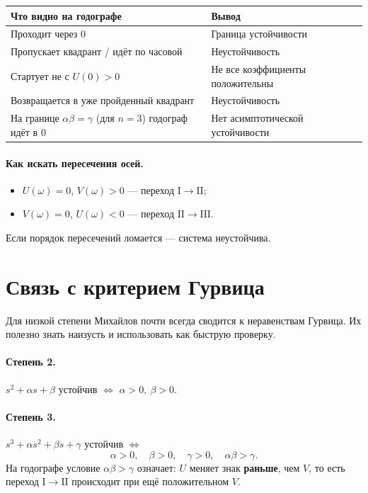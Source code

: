 \documentclass[11pt,a4paper]{article}
\begin{document}
\noindent
\renewcommand{\arraystretch}{1.25}%
\begin{tabularx}{\textwidth}{>{\raggedright\arraybackslash}X >{\raggedright\arraybackslash}X}
\toprule
\textbf{Что видно на годографе} & \textbf{Вывод} \\
\midrule
Проходит через \(0\) & Граница устойчивости \\
Пропускает квадрант / идёт по часовой & Неустойчивость \\
Стартует не с \(U(0)>0\) & Не все коэффициенты положительны \\
Возвращается в уже пройденный квадрант & Неустойчивость \\
На границе \(\alpha\beta=\gamma\) (для \(n=3\)) годограф идёт в \(0\) & Нет асимптотической устойчивости \\
\bottomrule
\end{tabularx}

\paragraph{Как искать пересечения осей.}
\begin{itemize}
  \item \(U(\omega)=0\), \(V(\omega)>0\) --- переход \(\mathrm{I}\to\mathrm{II}\);
  \item \(V(\omega)=0\), \(U(\omega)<0\) --- переход \(\mathrm{II}\to\mathrm{III}\).
\end{itemize}
Если порядок пересечений ломается --- система неустойчива.

\section{Связь с критерием Гурвица}

Для низкой степени Михайлов почти всегда сводится к неравенствам Гурвица.
Их полезно знать наизусть и использовать как быструю проверку.

\paragraph{Степень 2.}
\(s^2+\alpha s+\beta\) устойчив \(\Leftrightarrow\) \(\alpha>0,\ \beta>0\).

\paragraph{Степень 3.}
\(s^3+\alpha s^2+\beta s+\gamma\) устойчив \(\Leftrightarrow\)
\[
\alpha>0,\quad \beta>0,\quad \gamma>0,\quad \alpha\beta>\gamma.
\]
На годографе условие \(\alpha\beta>\gamma\) означает: \(U\) меняет знак \textbf{раньше}, чем \(V\),
то есть переход \(\mathrm{I}\to\mathrm{II}\) происходит при ещё положительном \(V\).
\end{document}
